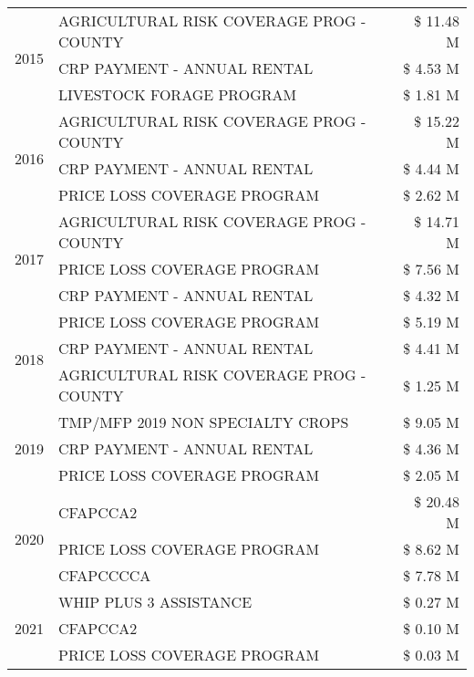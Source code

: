 \begin{tabular}{llr}
\multirow[t]{3}{*}{2015} & AGRICULTURAL RISK COVERAGE PROG - COUNTY & \$ 11.48 M \\
 & CRP PAYMENT - ANNUAL RENTAL & \$ 4.53 M \\
 & LIVESTOCK FORAGE PROGRAM & \$ 1.81 M \\
\cline{1-3}
\multirow[t]{3}{*}{2016} & AGRICULTURAL RISK COVERAGE PROG - COUNTY      & \$ 15.22 M \\
 & CRP PAYMENT - ANNUAL RENTAL                   & \$ 4.44 M \\
 & PRICE LOSS COVERAGE PROGRAM                   & \$ 2.62 M \\
\cline{1-3}
\multirow[t]{3}{*}{2017} & AGRICULTURAL RISK COVERAGE PROG - COUNTY & \$ 14.71 M \\
 & PRICE LOSS COVERAGE PROGRAM & \$ 7.56 M \\
 & CRP PAYMENT - ANNUAL RENTAL & \$ 4.32 M \\
\cline{1-3}
\multirow[t]{3}{*}{2018} & PRICE LOSS COVERAGE PROGRAM & \$ 5.19 M \\
 & CRP PAYMENT - ANNUAL RENTAL & \$ 4.41 M \\
 & AGRICULTURAL RISK COVERAGE PROG - COUNTY & \$ 1.25 M \\
\cline{1-3}
\multirow[t]{3}{*}{2019} & TMP/MFP 2019 NON SPECIALTY CROPS & \$ 9.05 M \\
 & CRP PAYMENT - ANNUAL RENTAL & \$ 4.36 M \\
 & PRICE LOSS COVERAGE PROGRAM & \$ 2.05 M \\
\cline{1-3}
\multirow[t]{3}{*}{2020} & CFAPCCA2 & \$ 20.48 M \\
 & PRICE LOSS COVERAGE PROGRAM & \$ 8.62 M \\
 & CFAPCCCCA & \$ 7.78 M \\
\cline{1-3}
\multirow[t]{3}{*}{2021} & WHIP PLUS 3 ASSISTANCE & \$ 0.27 M \\
 & CFAPCCA2 & \$ 0.10 M \\
 & PRICE LOSS COVERAGE PROGRAM & \$ 0.03 M \\
\cline{1-3}
\bottomrule
\end{tabular}
